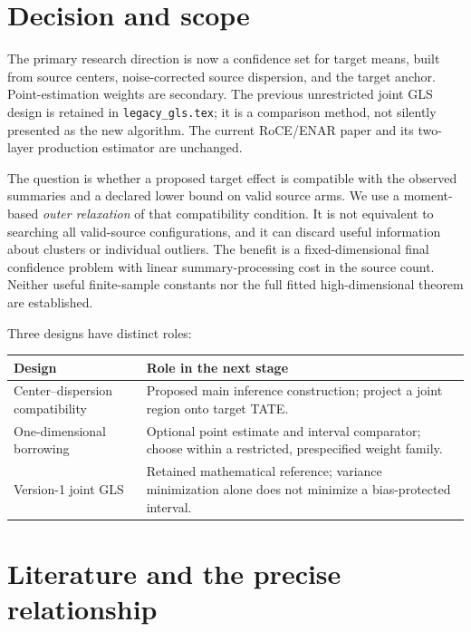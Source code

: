 \section{Decision and scope}

The primary research direction is now a confidence set for target means,
built from source centers, noise-corrected source dispersion, and the target
anchor. Point-estimation weights are secondary. The previous unrestricted
joint GLS design is retained in \texttt{legacy\_gls.tex}; it is a comparison
method, not silently presented as the new algorithm. The current RoCE/ENAR
paper and its two-layer production estimator are unchanged.

The question is whether a proposed target effect is compatible with the
observed summaries and a declared lower bound on valid source arms. We use
a moment-based \emph{outer relaxation} of that compatibility condition.
It is not equivalent to searching all valid-source configurations, and it
can discard useful information about clusters or individual outliers.
The benefit is a fixed-dimensional final confidence problem with linear
summary-processing cost in the source count. Neither useful finite-sample
constants nor the full fitted high-dimensional theorem are established.

Three designs have distinct roles:
\begin{center}
\begin{tabular}{@{}>{\raggedright\arraybackslash}p{.25\linewidth}>{\raggedright\arraybackslash}p{.68\linewidth}@{}}
\toprule
Design & Role in the next stage\\\midrule
Center--dispersion compatibility & Proposed main inference construction;
project a joint region onto target TATE.\\
One-dimensional borrowing & Optional point estimate and interval comparator;
choose within a restricted, prespecified weight family.\\
Version-1 joint GLS & Retained mathematical reference; variance minimization
alone does not minimize a bias-protected interval.\\\bottomrule
\end{tabular}
\end{center}

\section{Literature and the precise relationship}

